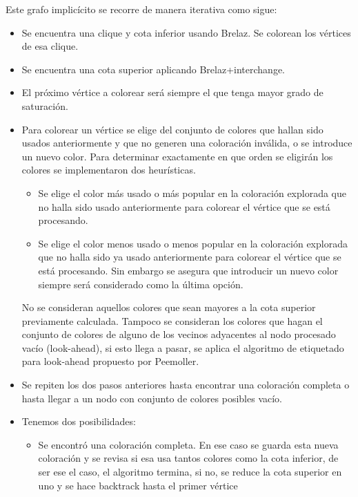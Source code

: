 \documentclass[a4paper,10pt]{article}
\begin{document}
\indent Este grafo implic\'icito se recorre de manera iterativa como sigue:
\begin{itemize}
 \item Se encuentra una clique y cota inferior usando Brelaz. Se colorean los
       v\'ertices de esa clique.
 \item Se encuentra una cota superior aplicando Brelaz+interchange.
 \item El pr\'oximo v\'ertice a colorear ser\'a siempre el que tenga
       mayor grado de saturaci\'on.
 \item Para colorear un v\'ertice se elige del conjunto de colores que hallan
       sido usados anteriormente y que no generen una coloraci\'on
       inv\'alida, o se introduce un nuevo color. Para determinar exactamente
       en que orden se eligir\'an los colores se implementaron dos heur\'isticas.
       \begin{itemize}
	\item Se elige el color m\'as usado o m\'as popular en la coloraci\'on
	      explorada que no halla sido usado anteriormente para
	      colorear el v\'ertice que se est\'a procesando. 
	\item Se elige el color menos usado o menos popular en la
	      coloraci\'on explorada que no halla sido ya usado
	      anteriormente para colorear el v\'ertice que se est\'a
	      procesando. Sin embargo se asegura que introducir un nuevo
	      color siempre ser\'a considerado como la \'ultima opci\'on.
       \end{itemize}
       No se consideran aquellos colores que sean mayores a la cota
       superior previamente calculada. Tampoco se consideran los colores
       que hagan el conjunto de colores de alguno de los vecinos
       adyacentes al nodo procesado vac\'io (look-ahead), si esto llega
       a pasar, se aplica el algoritmo de etiquetado para look-ahead
       propuesto por Peemoller.
\item Se repiten los dos pasos anteriores hasta encontrar una
      coloraci\'on completa o hasta llegar a un nodo con conjunto de
      colores posibles vac\'io.
\item Tenemos dos posibilidades:
      \begin{itemize}
	\item Se encontr\'o una coloraci\'on completa. En ese caso se
	      guarda esta nueva coloraci\'on y se revisa si esa usa
	      tantos colores como la cota inferior, de ser ese el caso,
	      el algoritmo termina, si no, se reduce la cota superior en
	      uno y se hace backtrack hasta el primer v\'ertice

\end{itemize}
\end{itemize}
\end{document}
